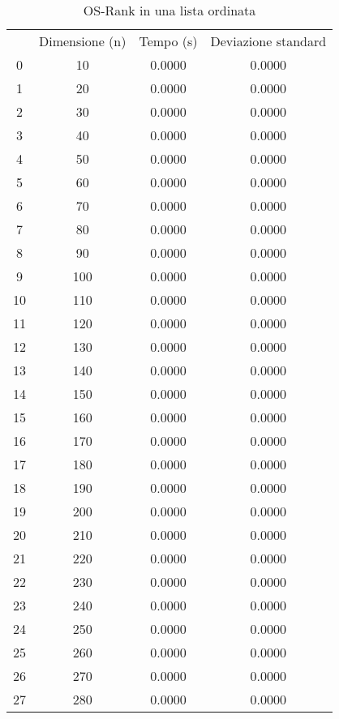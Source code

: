 \begin{table}
\centering
\caption{OS-Rank in una lista ordinata}
\label{OS-Rank in una lista ordinata}
\begin{adjustbox}{width=1\textwidth/2}
\begin{tabular}{|c|c|c|c|}
\hline
 & Dimensione (n) & Tempo (s) & Deviazione standard \\
0 & 10 & 0.0000 & 0.0000 \\
\cline{1-4}
1 & 20 & 0.0000 & 0.0000 \\
\cline{1-4}
2 & 30 & 0.0000 & 0.0000 \\
\cline{1-4}
3 & 40 & 0.0000 & 0.0000 \\
\cline{1-4}
4 & 50 & 0.0000 & 0.0000 \\
\cline{1-4}
5 & 60 & 0.0000 & 0.0000 \\
\cline{1-4}
6 & 70 & 0.0000 & 0.0000 \\
\cline{1-4}
7 & 80 & 0.0000 & 0.0000 \\
\cline{1-4}
8 & 90 & 0.0000 & 0.0000 \\
\cline{1-4}
9 & 100 & 0.0000 & 0.0000 \\
\cline{1-4}
10 & 110 & 0.0000 & 0.0000 \\
\cline{1-4}
11 & 120 & 0.0000 & 0.0000 \\
\cline{1-4}
12 & 130 & 0.0000 & 0.0000 \\
\cline{1-4}
13 & 140 & 0.0000 & 0.0000 \\
\cline{1-4}
14 & 150 & 0.0000 & 0.0000 \\
\cline{1-4}
15 & 160 & 0.0000 & 0.0000 \\
\cline{1-4}
16 & 170 & 0.0000 & 0.0000 \\
\cline{1-4}
17 & 180 & 0.0000 & 0.0000 \\
\cline{1-4}
18 & 190 & 0.0000 & 0.0000 \\
\cline{1-4}
19 & 200 & 0.0000 & 0.0000 \\
\cline{1-4}
20 & 210 & 0.0000 & 0.0000 \\
\cline{1-4}
21 & 220 & 0.0000 & 0.0000 \\
\cline{1-4}
22 & 230 & 0.0000 & 0.0000 \\
\cline{1-4}
23 & 240 & 0.0000 & 0.0000 \\
\cline{1-4}
24 & 250 & 0.0000 & 0.0000 \\
\cline{1-4}
25 & 260 & 0.0000 & 0.0000 \\
\cline{1-4}
26 & 270 & 0.0000 & 0.0000 \\
\cline{1-4}
27 & 280 & 0.0000 & 0.0000 \\

\end{tabular}
\end{adjustbox}
\end{table}
